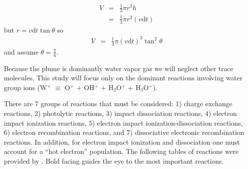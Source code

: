 \documentclass[12pt, letterpaper]{article}
\begin{document}
\begin{eqnarray}
V & = & \frac{1}{3} \pi r^{2} h \nonumber \\
& = & \frac{1}{3} \pi r^{2} \left( v \text{d}t \right)
\end{eqnarray}
but $r = v\text{d}t \tan \theta$ so
\begin{eqnarray}
V & = & \frac{1}{3} \pi \left( v \text{d}t \right) ^{3} \tan ^{2} \theta
\end{eqnarray}
and assume $\theta = \frac{\pi}{6}$.

Because the plume is dominantly water vapor gas we will neglect other trace molecules. This study will focus only on the dominant reactions involving water group ions (W$^{+}$ $\equiv$ O$^{+}$ $+$ OH$^{+}$ $+$ H$_{2}$O$^{+}$ $+$ H$_{3}$O$^{+}$).

There are 7 groups of reactions that must be considered: 1) charge exchange reactions, 2) photolytic reactions, 3) impact dissociation reactions, 4) electron impact ionization reactions, 5) electron impact ionization-dissociation reactions, 6) electron recombination reactions, and 7) dissociative electronic recombination reactions. In addition, for electron impact ionization and dissociation one must account for a \enquote{hot electron} population. The following tables of reactions were provided by \citep{Fleshman10}. Bold facing guides the eye to the most important reactions.
\end{document}
